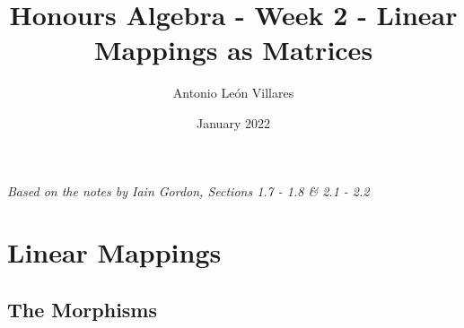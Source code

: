 \documentclass{exam}
\title{Honours Algebra - Week 2 - Linear Mappings as Matrices}
\author{Antonio León Villares}
\date{January 2022}
\begin{document}
\maketitle

\tableofcontents

\pagebreak

\textit{Based on the notes by Iain Gordon, Sections 1.7 - 1.8 \& 2.1 - 2.2}

\section{Linear Mappings}

\subsection{The Morphisms}
\end{document}
